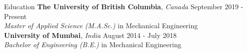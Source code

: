 \documentclass{resume} %
\begin{document}
\vspace*{-2mm}

\vspace*{-1mm}
\begin{rSection}{Education}
{\bf The University of British Columbia}, \textit{Canada} \hfill {September 2019 - Present} \\ 
\textit{Master of Applied Science (M.A.Sc.)} in Mechanical Engineering \\

\vspace*{-4mm}
{\bf University of Mumbai}, \textit{India} \hfill {August 2014 - July 2018} \\ 
\textit{Bachelor of Engineering (B.E.)} in Mechanical Engineering \\
\end{rSection}
\end{document}
